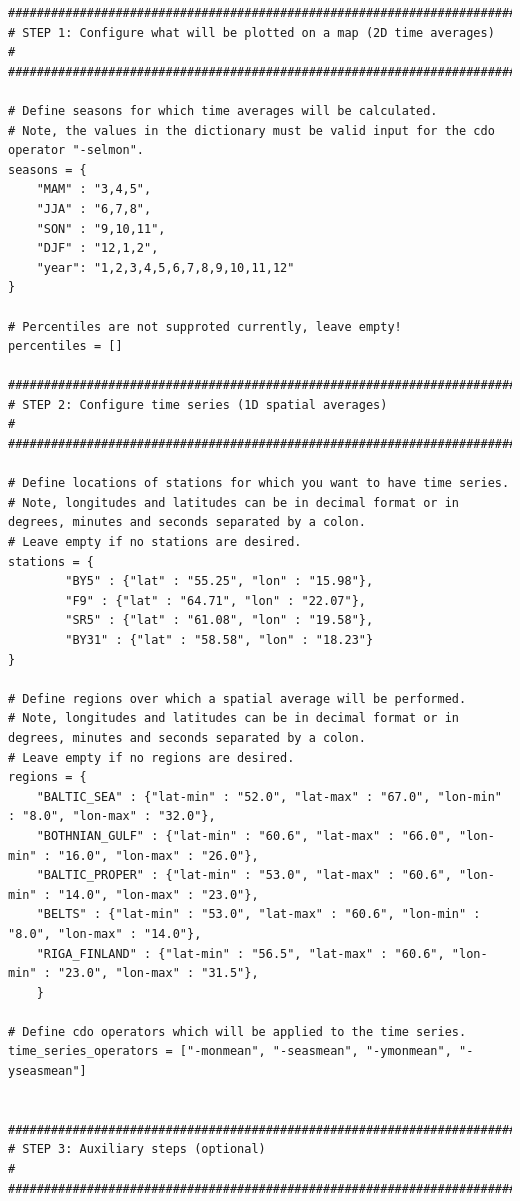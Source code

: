 \documentclass[a4paper,titlepage]{scrartcl}
\begin{document}
\begin{verbatim}
##########################################################################
# STEP 1: Configure what will be plotted on a map (2D time averages)     #
##########################################################################

# Define seasons for which time averages will be calculated.
# Note, the values in the dictionary must be valid input for the cdo operator "-selmon".
seasons = {
    "MAM" : "3,4,5",
    "JJA" : "6,7,8",
    "SON" : "9,10,11",
    "DJF" : "12,1,2",
    "year": "1,2,3,4,5,6,7,8,9,10,11,12"
}

# Percentiles are not supproted currently, leave empty!
percentiles = []

##########################################################################
# STEP 2: Configure time series (1D spatial averages)                    #
##########################################################################

# Define locations of stations for which you want to have time series.
# Note, longitudes and latitudes can be in decimal format or in degrees, minutes and seconds separated by a colon.
# Leave empty if no stations are desired.
stations = { 
        "BY5" : {"lat" : "55.25", "lon" : "15.98"},
        "F9" : {"lat" : "64.71", "lon" : "22.07"},
        "SR5" : {"lat" : "61.08", "lon" : "19.58"},
        "BY31" : {"lat" : "58.58", "lon" : "18.23"}        
}

# Define regions over which a spatial average will be performed.
# Note, longitudes and latitudes can be in decimal format or in degrees, minutes and seconds separated by a colon.
# Leave empty if no regions are desired.
regions = { 
    "BALTIC_SEA" : {"lat-min" : "52.0", "lat-max" : "67.0", "lon-min" : "8.0", "lon-max" : "32.0"},
    "BOTHNIAN_GULF" : {"lat-min" : "60.6", "lat-max" : "66.0", "lon-min" : "16.0", "lon-max" : "26.0"},
    "BALTIC_PROPER" : {"lat-min" : "53.0", "lat-max" : "60.6", "lon-min" : "14.0", "lon-max" : "23.0"},
    "BELTS" : {"lat-min" : "53.0", "lat-max" : "60.6", "lon-min" : "8.0", "lon-max" : "14.0"},
    "RIGA_FINLAND" : {"lat-min" : "56.5", "lat-max" : "60.6", "lon-min" : "23.0", "lon-max" : "31.5"},
	}

# Define cdo operators which will be applied to the time series.
time_series_operators = ["-monmean", "-seasmean", "-ymonmean", "-yseasmean"]


##########################################################################
# STEP 3: Auxiliary steps (optional)                                     #
##########################################################################


\end{verbatim}
\end{document}
